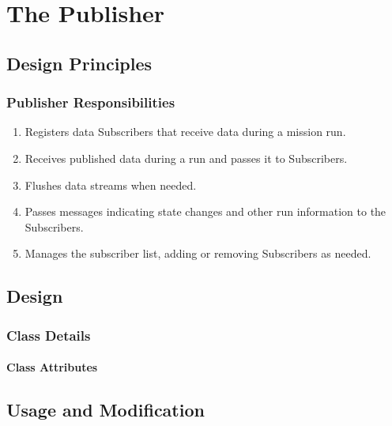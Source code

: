 \chapter{\label{chapter:Publisher}The Publisher}

\section{Design Principles}

\subsection{Publisher Responsibilities}

\begin{enumerate}
\item Registers data Subscribers that receive data during a mission run.
\item Receives published data during a run and passes it to Subscribers.
\item Flushes data streams when needed.
\item Passes messages indicating state changes and other run information to the Subscribers.
\item Manages the subscriber list, adding or removing Subscribers as needed.
\end{enumerate}

\section{Design}

\subsection{Class Details}

\subsubsection{Class Attributes}

\section{Usage and Modification}
